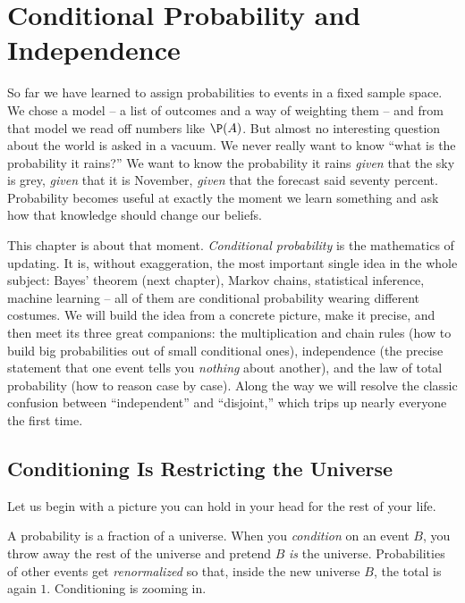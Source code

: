 \chapter{Conditional Probability and Independence}

So far we have learned to assign probabilities to events in a fixed sample space. We chose a model -- a list of outcomes and a way of weighting them -- and from that model we read off numbers like $\P(A)$. But almost no interesting question about the world is asked in a vacuum. We never really want to know ``what is the probability it rains?'' We want to know the probability it rains \emph{given} that the sky is grey, \emph{given} that it is November, \emph{given} that the forecast said seventy percent. Probability becomes useful at exactly the moment we learn something and ask how that knowledge should change our beliefs.

This chapter is about that moment. \emph{Conditional probability} is the mathematics of updating. It is, without exaggeration, the most important single idea in the whole subject: Bayes' theorem (next chapter), Markov chains, statistical inference, machine learning -- all of them are conditional probability wearing different costumes. We will build the idea from a concrete picture, make it precise, and then meet its three great companions: the multiplication and chain rules (how to build big probabilities out of small conditional ones), independence (the precise statement that one event tells you \emph{nothing} about another), and the law of total probability (how to reason case by case). Along the way we will resolve the classic confusion between ``independent'' and ``disjoint,'' which trips up nearly everyone the first time.

\section{Conditioning Is Restricting the Universe}
\label{ch04:restricting}

Let us begin with a picture you can hold in your head for the rest of your life.

\begin{intuitionbox}
A probability is a fraction of a universe. When you \emph{condition} on an event $B$, you throw away the rest of the universe and pretend $B$ \emph{is} the universe. Probabilities of other events get \emph{renormalized} so that, inside the new universe $B$, the total is again $1$. Conditioning is zooming in.
\end{intuitionbox}

